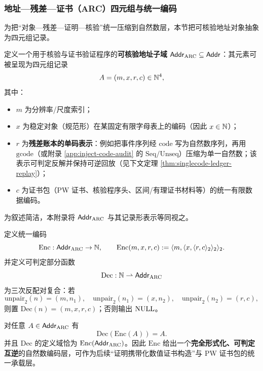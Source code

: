 \subsubsection{地址—残差—证书（ARC）四元组与统一编码}

为把“对象—残差—证明—核验”统一压缩到自然数层，本节把可核验地址对象抽象为四元组记录。

\begin{definition}\label{def:arc-record}
定义一个用于核验与证书验证程序的\textbf{可核验地址子域} $\mathsf{Addr}_{\mathrm{ARC}}\subseteq\mathsf{Addr}$：其元素可被呈现为四元组记录
$$
A=(m,x,r,c)\in\mathbb{N}^4,
$$
其中：
\begin{itemize}
  \item $m$ 为分辨率/尺度索引；
  \item $x$ 为稳定对象（规范形）在某固定有限字母表上的编码（因此 $x\in\mathbb{N}$）；
  \item $r$ 为\textbf{残差账本的单码表示}：例如把事件序列经 $\mathrm{code}$ 写为自然数序列，再用 $\mathrm{gcode}$（或附录 \ref{app:inject-code-audit} 的 $\mathrm{Seq}/\mathrm{Unseq}$）压缩为单一自然数；该表示可判定反解并保持可逆回放（见下文定理 \ref{thm:singlecode-ledger-replay}）；
  \item $c$ 为证书包（PW 证书、核验程序头、区间/有理证书材料等）的统一有限数据编码。
\end{itemize}
为叙述简洁，本附录将 $\mathsf{Addr}_{\mathrm{ARC}}$ 与其记录形表示等同视之。
\end{definition}

\begin{definition}[统一编码与解码]\label{def:arc-enc-dec}
定义统一编码
$$
\mathrm{Enc}:\mathsf{Addr}_{\mathrm{ARC}}\to\mathbb{N},\qquad
\mathrm{Enc}(m,x,r,c):=\langle m,\langle x,\langle r,c\rangle_2\rangle_2\rangle_2.
$$
并定义可判定部分函数
$$
\mathrm{Dec}:\mathbb{N}\rightharpoonup \mathsf{Addr}_{\mathrm{ARC}}
$$
为三次反配对复合：若
$$
\mathrm{unpair}_2(n)=(m,n_1),\quad
\mathrm{unpair}_2(n_1)=(x,n_2),\quad
\mathrm{unpair}_2(n_2)=(r,c),
$$
则置 $\mathrm{Dec}(n)=(m,x,r,c)$；否则输出 $\mathrm{NULL}$。
\end{definition}

\begin{theorem}\label{thm:arc-godel-invertible}
对任意 $A\in\mathsf{Addr}_{\mathrm{ARC}}$ 有
$$
\mathrm{Dec}(\mathrm{Enc}(A))=A.
$$
并且 $\mathrm{Dec}$ 的定义域恰为 $\mathrm{Enc}(\mathsf{Addr}_{\mathrm{ARC}})$。因此 $\mathrm{Enc}$ 给出一个\textbf{完全形式化、可判定互逆}的自然数编码层，可作为后续“证明携带化数值证书构造”与 PW 证书包的统一承载层。
\end{theorem}

